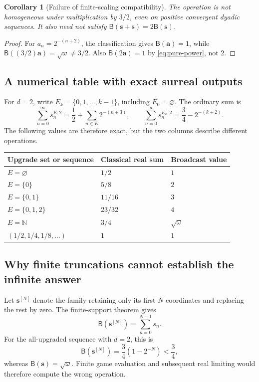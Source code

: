\documentclass[11pt,letterpaper]{article}
\newtheorem{corollary}[theorem]{Corollary}
\theoremstyle{definition}
\theoremstyle{remark}
\newcommand{\NN}{\mathbb N}
\newcommand{\BB}{\mathsf B}
\newcommand{\bs}{\boldsymbol{s}}
\begin{document}
\begin{corollary}[Failure of finite-scaling compatibility]\label{cor:scaling}
The operation is not homogeneous under multiplication by $3/2$, even on
positive convergent dyadic sequences. It also need not satisfy
$\BB(\bs+\bs)=2\BB(\bs)$.
\end{corollary}
\begin{proof}
For $a_n=2^{-(n+2)}$, the classification gives $\BB(\boldsymbol a)=1$, while
$\BB((3/2)\boldsymbol a)=\sqrt{\omega}\neq3/2$. Also
$\BB(2\boldsymbol a)=1$ by \eqref{eq:pure-power}, not $2$.
\end{proof}

\subsection{A numerical table with exact surreal outputs}

For $d=2$, write $E_k=\{0,1,\ldots,k-1\}$, including $E_0=\varnothing$.
The ordinary sum is
\begin{equation}\label{eq:finite-E-real-sum}
 \sum_{n=0}^{\infty}s_n^{E,2}
       =\frac12+\sum_{n\in E}2^{-(n+3)},\qquad
 \sum_{n=0}^{\infty}s_n^{E_k,2}=\frac34-2^{-(k+2)}.
\end{equation}
The following values are therefore exact, but the two columns describe
different operations.

\begin{center}
\renewcommand{\arraystretch}{1.16}
\begin{tabular}{lll}
\toprule
Upgrade set or sequence & Classical real sum & Broadcast value\\
\midrule
$E=\varnothing$ & $1/2$ & $1$\\
$E=\{0\}$ & $5/8$ & $2$\\
$E=\{0,1\}$ & $11/16$ & $3$\\
$E=\{0,1,2\}$ & $23/32$ & $4$\\
$E=\NN$ & $3/4$ & $\sqrt{\omega}$\\
$(1/2,1/4,1/8,\ldots)$ & $1$ & $1$\\
\bottomrule
\end{tabular}
\end{center}

\subsection{Why finite truncations cannot establish the infinite answer}

Let $\bs^{[N]}$ denote the family retaining only its first $N$ coordinates and
replacing the rest by zero. The finite-support theorem gives
\[
                      \BB(\bs^{[N]})=\sum_{n=0}^{N-1}s_n.
\]
For the all-upgraded sequence with $d=2$, this is
\begin{equation}\label{eq:partial-sum}
                   \BB(\bs^{[N]})=\frac34(1-2^{-N})<\frac34,
\end{equation}
whereas $\BB(\bs)=\sqrt{\omega}$. Finite game evaluation and subsequent real
limiting would therefore compute the wrong operation.
\end{document}
